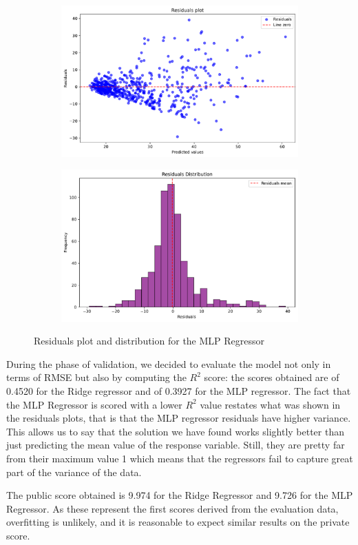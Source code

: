 \begin{figure}
    \centering
    \begin{subfigure}{0.23\textwidth}
        \centering
        \includegraphics[width=\textwidth]{img/residuals_mlp_2.pdf}
    \end{subfigure}
    \begin{subfigure}{0.23\textwidth}
        \centering
        \includegraphics[width=\textwidth]{img/residuals_mlp_1.pdf} 
    \end{subfigure}
    \caption{Residuals plot and distribution for the MLP Regressor}
    \label{fig:res_MLP}
\end{figure}

During the phase of validation, we decided to evaluate the model not only in terms of RMSE but also by computing the $R^2$ score: the scores obtained are of 0.4520 for the Ridge regressor and of 0.3927 for the MLP regressor. The fact that the MLP Regressor is scored with a lower $R^2$ value restates what was shown in the residuals plots, that is that the MLP regressor residuals have higher variance.
This allows us to say that the solution we have found works slightly better than just predicting the mean value of the response variable. Still, they are pretty far from their maximum value 1 which means that the regressors fail to capture great part of the variance of the data.

The public score obtained is 9.974 for the Ridge Regressor and 9.726 for the MLP Regressor.
As these represent the first scores derived from the evaluation data, overfitting is unlikely, and it is reasonable to expect similar results on the private score.